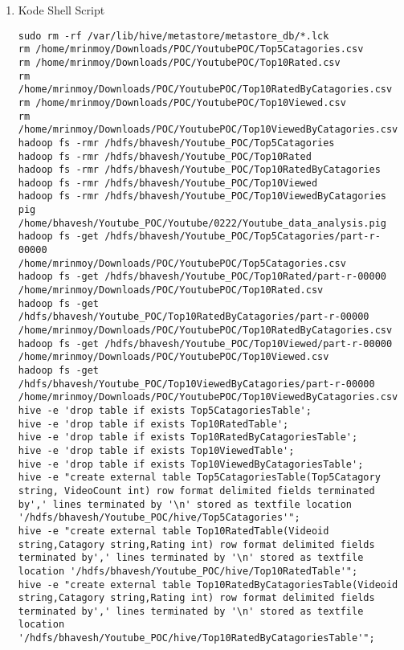 \documentclass[a4paper]{tufte-handout}
\begin{document}
\begin{enumerate}
\item Kode Shell Script

\begin{lstlisting}
sudo rm -rf /var/lib/hive/metastore/metastore_db/*.lck
rm /home/mrinmoy/Downloads/POC/YoutubePOC/Top5Catagories.csv
rm /home/mrinmoy/Downloads/POC/YoutubePOC/Top10Rated.csv
rm /home/mrinmoy/Downloads/POC/YoutubePOC/Top10RatedByCatagories.csv
rm /home/mrinmoy/Downloads/POC/YoutubePOC/Top10Viewed.csv
rm /home/mrinmoy/Downloads/POC/YoutubePOC/Top10ViewedByCatagories.csv
hadoop fs -rmr /hdfs/bhavesh/Youtube_POC/Top5Catagories
hadoop fs -rmr /hdfs/bhavesh/Youtube_POC/Top10Rated
hadoop fs -rmr /hdfs/bhavesh/Youtube_POC/Top10RatedByCatagories
hadoop fs -rmr /hdfs/bhavesh/Youtube_POC/Top10Viewed
hadoop fs -rmr /hdfs/bhavesh/Youtube_POC/Top10ViewedByCatagories
pig /home/bhavesh/Youtube_POC/Youtube/0222/Youtube_data_analysis.pig
hadoop fs -get /hdfs/bhavesh/Youtube_POC/Top5Catagories/part-r-00000               /home/mrinmoy/Downloads/POC/YoutubePOC/Top5Catagories.csv
hadoop fs -get /hdfs/bhavesh/Youtube_POC/Top10Rated/part-r-00000                   /home/mrinmoy/Downloads/POC/YoutubePOC/Top10Rated.csv
hadoop fs -get /hdfs/bhavesh/Youtube_POC/Top10RatedByCatagories/part-r-00000       /home/mrinmoy/Downloads/POC/YoutubePOC/Top10RatedByCatagories.csv
hadoop fs -get /hdfs/bhavesh/Youtube_POC/Top10Viewed/part-r-00000                  /home/mrinmoy/Downloads/POC/YoutubePOC/Top10Viewed.csv
hadoop fs -get /hdfs/bhavesh/Youtube_POC/Top10ViewedByCatagories/part-r-00000      /home/mrinmoy/Downloads/POC/YoutubePOC/Top10ViewedByCatagories.csv
hive -e 'drop table if exists Top5CatagoriesTable';
hive -e 'drop table if exists Top10RatedTable';
hive -e 'drop table if exists Top10RatedByCatagoriesTable';
hive -e 'drop table if exists Top10ViewedTable';
hive -e 'drop table if exists Top10ViewedByCatagoriesTable';
hive -e "create external table Top5CatagoriesTable(Top5Catagory string, VideoCount int) row format delimited fields terminated by',' lines terminated by '\n' stored as textfile location '/hdfs/bhavesh/Youtube_POC/hive/Top5Catagories'";
hive -e "create external table Top10RatedTable(Videoid string,Catagory string,Rating int) row format delimited fields terminated by',' lines terminated by '\n' stored as textfile location '/hdfs/bhavesh/Youtube_POC/hive/Top10RatedTable'";
hive -e "create external table Top10RatedByCatagoriesTable(Videoid string,Catagory string,Rating int) row format delimited fields terminated by',' lines terminated by '\n' stored as textfile location '/hdfs/bhavesh/Youtube_POC/hive/Top10RatedByCatagoriesTable'";

\end{lstlisting}
\end{enumerate}
\end{document}
